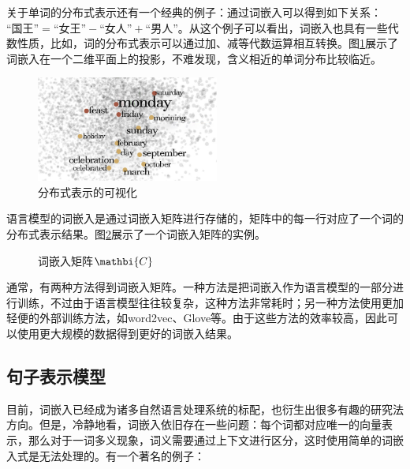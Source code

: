 \parinterval  关于单词的分布式表示还有一个经典的例子：通过词嵌入可以得到如下关系：$\textrm{“国王”}=\textrm{“女王”}-\textrm{“女人”} +\textrm{“男人”}$。从这个例子可以看出，词嵌入也具有一些代数性质，比如，词的分布式表示可以通过加、减等代数运算相互转换。图\ref{fig:9-66}展示了词嵌入在一个二维平面上的投影，不难发现，含义相近的单词分布比较临近。

\begin{figure}[htp]
\centering
\includegraphics[width=6cm]{./Chapter9/Figures/figure-word-graph.jpg}
\caption{分布式表示的可视化}
\label{fig:9-66}
\end{figure}

\parinterval  语言模型的词嵌入是通过词嵌入矩阵进行存储的，矩阵中的每一行对应了一个词的分布式表示结果。图\ref{fig:9-67}展示了一个词嵌入矩阵的实例。

\begin{figure}[htp]
\centering

\caption{词嵌入矩阵${\mathbi{C}}$}
\label{fig:9-67}
\end{figure}

\parinterval  通常，有两种方法得到词嵌入矩阵。一种方法是把词嵌入作为语言模型的一部分进行训练，不过由于语言模型往往较复杂，这种方法非常耗时；另一种方法使用更加轻便的外部训练方法，如word2vec、Glove等。由于这些方法的效率较高，因此可以使用更大规模的数据得到更好的词嵌入结果。


\subsection{句子表示模型}

\parinterval  目前，词嵌入已经成为诸多自然语言处理系统的标配，也衍生出很多有趣的研究法方向。但是，冷静地看，词嵌入依旧存在一些问题：每个词都对应唯一的向量表示，那么对于一词多义现象，词义需要通过上下文进行区分，这时使用简单的词嵌入式是无法处理的。有一个著名的例子：


